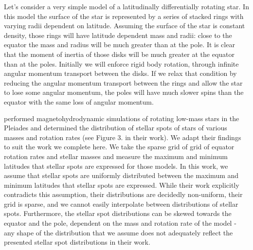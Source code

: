 Let's consider a very simple model of a latitudinally differentially rotating star.
In this model the surface of the star is represented by a series of stacked rings with varying radii dependent on latitude.
Assuming the surface of the star is constant density, those rings will have latitude dependent mass and radii: close to the equator the mass and radius will be much greater than at the pole.
It is clear that the moment of inertia of those disks will be much greater at the equator than at the poles.
Initially we will enforce rigid body rotation, through infinite angular momentum transport between the disks.
If we relax that condition by reducing the angular momentum transport between the rings and allow the star to lose some angular momentum, the poles will have much slower spins than the equator with the same loss of angular momentum.

\citet{granzer_spotted_2003} performed magnetohydrodynamic simulations of rotating low-mass stars in the Pleiades and determined the distribution of stellar spots of stars of various masses and rotation rates (see Figure 3. in their work).
We adapt their findings to suit the work we complete here.
We take the sparse grid of grid of equator rotation rates and stellar masses and measure the maximum and minimum latitudes that stellar spots are expressed for those models.
In this work, we assume that stellar spots are uniformly distributed between the maximum and minimum latitudes that stellar spots are expressed.
While their work explicitly contradicts this assumption, their distributions are decidedly non-uniform, their grid is sparse, and we cannot easily interpolate between distributions of stellar spots.
Furthermore, the stellar spot distributions can be skewed towards the equator and the pole, dependent on the mass and rotation rate of the model - any shape of the distribution that we assume does not adequately reflect the presented stellar spot distributions in their work.